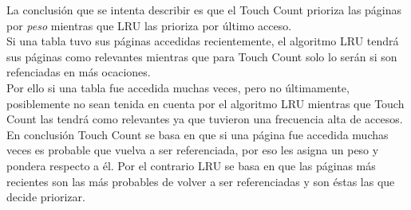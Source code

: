 \documentclass[11pt, a4paper, spanish]{article}
\begin{document}
La conclusi\'on que se intenta describir es que el Touch Count prioriza las p\'aginas por \textit{peso} mientras que LRU las prioriza por \'ultimo 
acceso.\\

Si una tabla tuvo sus p\'aginas accedidas recientemente, el algoritmo LRU tendr\'a sus p\'aginas como relevantes mientras que para Touch Count 
solo lo ser\'an si son refenciadas en m\'as ocaciones. \\

Por ello si una tabla fue accedida muchas veces, pero no \'ultimamente, 
posiblemente no sean tenida en cuenta por el algoritmo LRU mientras que Touch Count las tendr\'a como relevantes ya que tuvieron una frecuencia alta de
accesos. \\ 

En conclusi\'on Touch Count se basa en que si una p\'agina fue accedida muchas veces es probable que vuelva a ser referenciada, por eso les 
asigna un peso y pondera respecto a \'el. Por el contrario LRU se basa en que las p\'aginas m\'as recientes son las m\'as probables de volver a ser
referenciadas y son \'estas las que decide priorizar.
\end{document}
